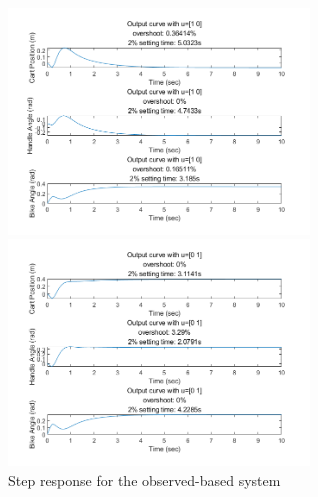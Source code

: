 \documentclass[hyperref]{article}
\theoremstyle{nonumberplain}
\begin{document}
	\begin{figure}[H]
		\centering
		\begin{minipage}[t]{0.48\textwidth}
			\centering
			\includegraphics[width=8cm]{fig22.png}
		\end{minipage}
		\begin{minipage}[t]{0.48\textwidth}
			\centering
			\includegraphics[width=8cm]{fig21.png}
		\end{minipage}
		\caption{Step response for the observed-based system}
		\label{fig16}
	\end{figure}
\end{document}
